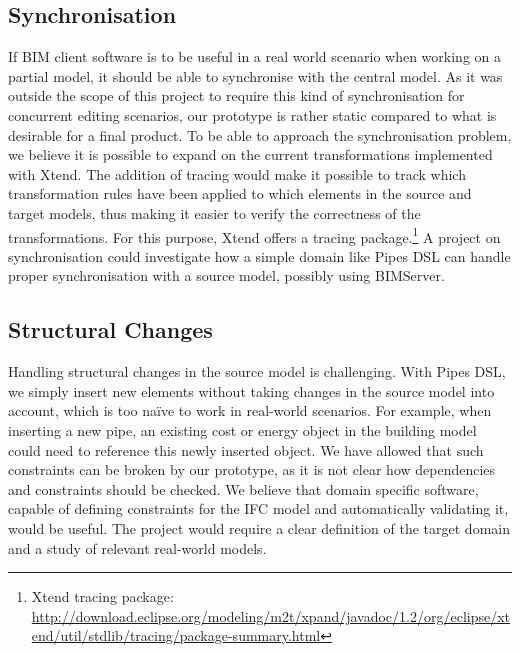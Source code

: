 \subsection{Synchronisation}
If BIM client software is to be useful in a real world scenario when working on a partial model, it should be able to synchronise with the central model. As it was outside the scope of this project to require this kind of synchronisation for concurrent editing scenarios, our prototype is rather static compared to what is desirable for a final product. To be able to approach the synchronisation problem, we believe it is possible to expand on the current transformations implemented with Xtend. The addition of tracing would make it possible to track which transformation rules have been applied to which elements in the source and target models, thus making it easier to verify the correctness of the transformations. For this purpose, Xtend offers a tracing package.\footnote{Xtend tracing package: \url{http://download.eclipse.org/modeling/m2t/xpand/javadoc/1.2/org/eclipse/xtend/util/stdlib/tracing/package-summary.html}} A project on synchronisation could investigate how a simple domain like Pipes DSL can handle proper synchronisation with a source model, possibly using BIMServer.

\subsection{Structural Changes}
Handling structural changes in the source model is challenging. With Pipes DSL, we simply insert new elements without taking changes in the source model into account, which is too na\"{i}ve to work in real-world scenarios. For example, when inserting a new pipe, an existing cost or energy object in the building model could need to reference this newly inserted object. We have allowed that such constraints can be broken by our prototype, as it is not clear how dependencies and constraints should be checked. We believe that domain specific software, capable of defining constraints for the IFC model and automatically validating it, would be useful. The project would require a clear definition of the target domain and a study of relevant real-world models.





